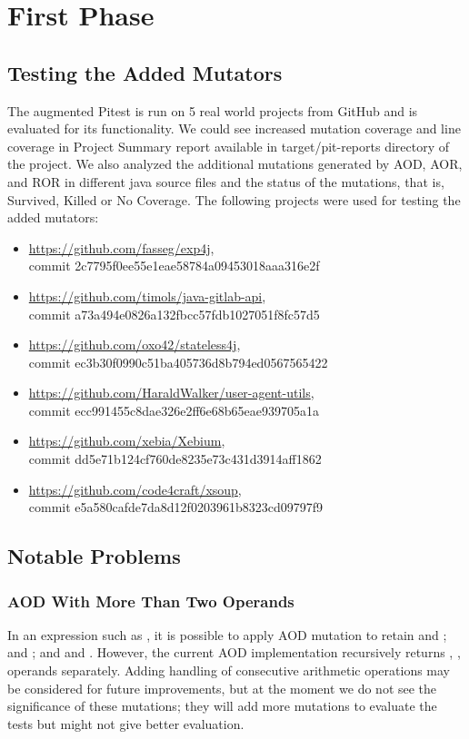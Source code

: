 \section{First Phase}





\subsection{Testing the Added Mutators}
The augmented Pitest is run on 5 real world projects from GitHub and is evaluated for its functionality.
We could see increased mutation coverage and line coverage in Project Summary report available in target/pit-reports directory of the project.
We also analyzed the additional mutations generated by AOD, AOR, and ROR in different java source files and the status of the mutations, that is, Survived, Killed or No Coverage.
The following projects were used for testing the added mutators:
\begin{itemize}
\item
  \url{https://github.com/fasseg/exp4j}, \\
  commit 2c7795f0ee55e1eae58784a09453018aaa316e2f
\item
  \url{https://github.com/timols/java-gitlab-api}, \\
  commit a73a494e0826a132fbcc57fdb1027051f8fc57d5
\item
  \url{https://github.com/oxo42/stateless4j}, \\
  commit ec3b30f0990c51ba405736d8b794ed0567565422
\item
  \url{https://github.com/HaraldWalker/user-agent-utils}, \\
  commit ecc991455c8dae326e2ff6e68b65eae939705a1a
\item
  \url{https://github.com/xebia/Xebium}, \\
  commit dd5e71b124cf760de8235e73c431d3914aff1862
\item
  \url{https://github.com/code4craft/xsoup}, \\
  commit e5a580cafde7da8d12f0203961b8323cd09797f9
\end{itemize}

\subsection{Notable Problems}
\subsubsection{AOD With More Than Two Operands}
In an expression such as , it is possible to apply AOD mutation to retain  and ;  and ; and  and .
However, the current AOD implementation recursively returns , ,  operands separately.
Adding handling of consecutive arithmetic operations may be considered for future improvements, but at the moment we do not see the significance of these mutations;
they will add more mutations to evaluate the tests but might not give better evaluation.

